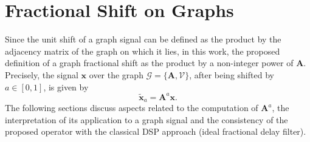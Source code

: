 \section{Fractional Shift on Graphs}\label{sec:fracshift}
Since the unit shift of a graph signal can be defined as the product by the adjacency matrix of the graph on which it lies, in this work, the proposed definition of a graph fractional shift as the product by a non-integer power of $ \mathbf{A} $. Precisely, the signal $\mathbf{x}$ over the graph $\mathcal{G} = \{ \mathbf{A}, {\mathcal{V}} \}$, after being shifted by $a\in[0,1]$, is given by
\begin{equation}
\label{eq:def_frac_delay}
\widetilde{\mathbf{x}}_a = \mathbf{A}^a \mathbf{x}.
\end{equation}
The following sections discuss aspects related to the computation of $\mathbf{A}^a$, the interpretation of its application to a graph signal and the consistency of the proposed operator with the classical DSP approach (ideal fractional delay filter).

